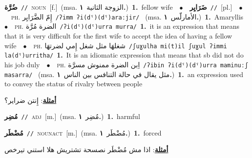 \documentclass[10pt,a4paper,twoside]{article} %
\begin{document}
\begin{multicols}{2}
{\setlength\topsep{0pt}\textbf{\foreignlanguage{arabic}{ضُرَّة}}\ {\color{gray}\texttt{//}\color{black}}\ \textsc{noun}\ [f.]\ \color{gray}(msa. \foreignlanguage{arabic}{الزوجة الثانية}~\foreignlanguage{arabic}{\textbf{١.}})\color{black}\ \textbf{1.}~fellow wife\ \ $\bullet$\ \ \setlength\topsep{0pt}\textbf{\foreignlanguage{arabic}{ضَرَايِر}}\ {\color{gray}\texttt{//}\color{black}}\ [pl.]\ \ $\bullet$\ \ \textsc{ph.} \color{gray} \foreignlanguage{arabic}{إِمّ الضَّرَايِر}\color{black}\ {\color{gray}\texttt{/{\sffamily ʔimm ʔi(dˤ)(dˤ)araːjir}/}\color{black}}\ \color{gray} (msa. \foreignlanguage{arabic}{الأمارلّس}~\foreignlanguage{arabic}{\textbf{١.}})\color{black}\ \textbf{1.}~Amaryllis\ \ $\bullet$\ \ \textsc{ph.} \color{gray} \foreignlanguage{arabic}{الضرة مُرَّة}\color{black}\ {\color{gray}\texttt{/{\sffamily ʔi(dˤ)(dˤ)urra murra}/}\color{black}}\ \textbf{1.}~it is an expression that means that it is very difficult for the first wife to accept the idea of having a fellow wife\ \ $\bullet$\ \ \textsc{ph.} \color{gray} \foreignlanguage{arabic}{شغلهَا مثل شغل إِمي لضرتهَا}\color{black}\ {\color{gray}\texttt{/{\sffamily ʃuɣulha mi(t)il ʃuɣul ʔimmi la(dˤ)urritha}/}\color{black}}\ \textbf{1.}~It is an idiomatic expression that means that sb did not do his job duly\ \ $\bullet$\ \ \textsc{ph.} \color{gray} \foreignlanguage{arabic}{اِبن الضرة ممنوش مسرَّة}\color{black}\ {\color{gray}\texttt{/{\sffamily ʔibin ʔi(dˤ)(dˤ)urra maminuːʃ masarra}/}\color{black}}\ \color{gray} (msa. \foreignlanguage{arabic}{مثل يقال في حالة التنافس بين الناس}~\foreignlanguage{arabic}{\textbf{١.}})\color{black}\ \textbf{1.}~an expression used to convey the status of rivalry between people\  \begin{flushright}\color{gray}\foreignlanguage{arabic}{\textbf{\underline{\foreignlanguage{arabic}{أمثلة}}}: إِنتن ضراير؟}\end{flushright}\color{black}} \vspace{2mm}

{\setlength\topsep{0pt}\textbf{\foreignlanguage{arabic}{مُضِر}}\ {\color{gray}\texttt{//}\color{black}}\ \textsc{adj}\ [m.]\ \color{gray}(msa. \foreignlanguage{arabic}{مُضِر}~\foreignlanguage{arabic}{\textbf{١.}})\color{black}\ \textbf{1.}~harmful\ } \vspace{2mm}

{\setlength\topsep{0pt}\textbf{\foreignlanguage{arabic}{مُضْطَر}}\ {\color{gray}\texttt{//}\color{black}}\ \textsc{noun\textunderscore act}\ [m.]\ \color{gray}(msa. \foreignlanguage{arabic}{مُضْطَر}~\foreignlanguage{arabic}{\textbf{١.}})\color{black}\ \textbf{1.}~forced\  \begin{flushright}\color{gray}\foreignlanguage{arabic}{\textbf{\underline{\foreignlanguage{arabic}{أمثلة}}}: اذا مش مُضْطَر نصسحة تشتريش هلا استني تيرخص}\end{flushright}\color{black}} \vspace{2mm}


\end{multicols}
\end{document}
